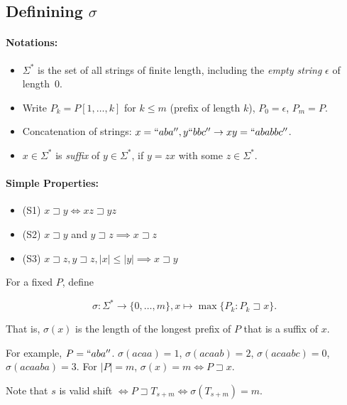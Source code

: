 \subsection{Definining $\sigma$}

\paragraph{Notations:}

\begin{itemize}
	\item $\Sigma^\ast$ is the set of all strings of finite length, including the \emph{empty string} $\epsilon$ of length~0.
	\item Write $P_k = P[1,\ldots, k]$ for $k \le m$ (prefix of length $k$), $P_0 = \epsilon$, $P_m=P$.
	\item Concatenation of strings: $x = ``aba'', y ``bbc'' \rightarrow xy = ``ababbc''$.
	\item $x \in \Sigma^\ast$ is \emph{suffix} of $y \in \Sigma^\ast$, if $y = zx$ with some $z \in \Sigma^\ast$.
\end{itemize}

\paragraph{Simple Properties:}
\begin{itemize}
	\item (S1) $x \sqsupset y \iff xz \sqsupset yz $
	\item (S2) $x \sqsupset y$ and $y \sqsupset z \implies x \sqsupset z$
	\item (S3) $x \sqsupset z, y \sqsupset z, |x| \le |y| \implies x \sqsupset y$
\end{itemize}

\begin{mydefinition}
	For a fixed $P$, define
	
	$$\sigma: \Sigma^\ast \rightarrow \{0,\ldots,m\}, x \mapsto \max \{ P_k : P_k \sqsupset x\}.$$
	
	That is, $\sigma(x)$ is the length of the longest prefix of $P$ that is a suffix of $x$.
\end{mydefinition}

For example, $P = ``aba''$. $\sigma(acaa) = 1$, $\sigma(acaab) = 2$, $\sigma(acaabc) = 0$, $\sigma(acaaba) = 3$. For $|P| = m$, $\sigma(x) =m \iff P \sqsupset x$.


\noindent Note that $s$ is valid shift $\iff P \sqsupset T_{s+m} \iff \sigma(T_{s+m}) = m$.

